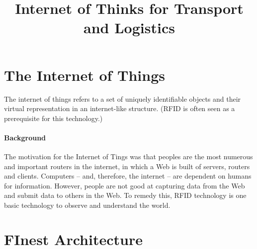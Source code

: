 \documentclass{llncs} %
\begin{document}
\title{Internet of Thinks for Transport and Logistics}
 

\maketitle

\begin{abstract}

\end{abstract}


\section{The Internet of Things}
The internet of things refers to a set of uniquely identifiable objects and their virtual representation in an internet-like structure. (RFID is often seen as a prerequisite for this technology.)


\paragraph{Background} The motivation for the Internet of Tings was that
peoples are the most numerous and important routers in the internet, in which
a Web is built of servers, routers and clients. Computers -- and, therefore, the internet --
are dependent on humans for information. However, people are not good
at capturing data from the Web and submit data to others in the Web.
To remedy this, RFID technology is one basic technology  to observe and understand the world.


\section{FInest Architecture}
\end{document}
